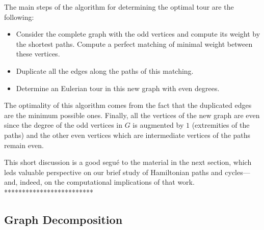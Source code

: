{The main steps of the algorithm for determining the optimal tour are the following:

\begin{itemize}
\item Consider the complete graph with the odd vertices and compute its weight by the shortest paths.
Compute a perfect matching of minimal weight between these vertices. 
\item Duplicate all the edges along the paths of this matching.
\item Determine an Eulerian tour in this new graph with even degrees.
\end{itemize}

The optimality of this algorithm comes from the fact that the duplicated edges are the minimum possible ones.
Finally, all the vertices of the new graph are even since the degree of the odd vertices in $G$ is augmented by $1$
(extremities of the paths) and the other even vertices which are intermediate vertices of the paths remain even. 

\medskip

This short discussion is a good segu\'{e} to the material in the next
section, which leds valuable perspective on our brief study of
Hamiltonian paths and cycles---and, indeed, on the computational
implications of that work.
*************************}


\subsection{Graph Decomposition}
\label{sec:graph-decompose}

